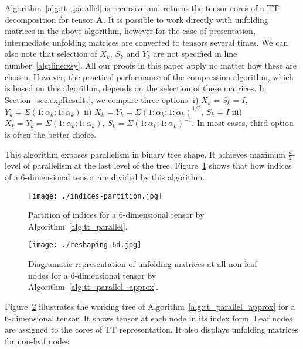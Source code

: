 \documentclass[runningheads]{llncs}
\newcommand{\tensor}[1]{\cal\textbf{#1}\xspace}
\begin{document}
Algorithm~\ref{alg:tt_parallel} is recursive and returns the tensor cores of a TT decomposition for tensor \tensor{A}. It is possible to work directly with unfolding matrices in the above algorithm, however for the ease of presentation, intermediate unfolding matrices are converted to tensors several times. We can also note that selection of $X_k$, $S_k$ and $Y_k$ are not specified in line number~\ref{alg:line:xsy}. All our proofs in this paper apply no matter how these are chosen. However, the practical performance of the compression algorithm, which is based on this algorithm, depends on the selection of these matrices. In Section~\ref{sec:expResults}, we compare three options: i) $X_k=S_k=I$, $Y_k = \Sigma(1:\alpha_k; 1:\alpha_k)$ ii) $X_k = Y_k = \Sigma(1:\alpha_k; 1:\alpha_k)^{1/2}$, $S_k = I$ iii) $X_k = Y_k = \Sigma(1:\alpha_k; 1:\alpha_k)$, $S_k = \Sigma(1:\alpha_k; 1:\alpha_k)^{-1} $. In most cases, third option is often the better choice.

This algorithm exposes parallelism in binary tree shape. It achieves maximum $\frac{d}{2}$-level of parallelism at the last level of the tree. Figure~\ref{fig:4dindices} shows that how indices of a $6$-dimensional tensor are divided by this algorithm.


\begin{figure}[htb]
	\begin{center}
		\texttt{[image: ./indices-partition.jpg]}
	\end{center}
	\caption{\label{fig:4dindices} Partition of indices for a $6$-dimensional tensor by Algorithm~\ref{alg:tt_parallel}.} 
\end{figure}


\begin{figure}[htb]
	\begin{center}
		\texttt{[image: ./reshaping-6d.jpg]}
	\end{center}
	\caption{Diagramatic representation of unfolding matrices at all non-leaf nodes for a $6$-dimensional tensor by Algorithm~\ref{alg:tt_parallel_approx}.\label{fig:ptt:reshaping}}
\end{figure}

\noindent Figure~\ref{fig:ptt:reshaping} illustrates the working tree of Algorithm~\ref{alg:tt_parallel_approx} for a $6$-dimensional tensor. It shows tensor at each node in its index form. Leaf nodes are assigned to the cores of TT representation. It also displays unfolding matrices for non-leaf nodes.
\end{document}
